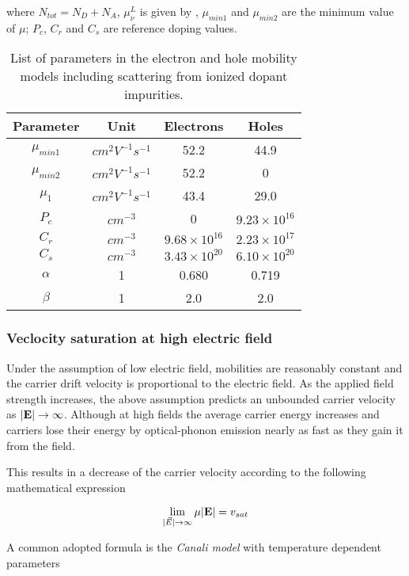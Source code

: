 where $N_{tot} = N_D + N_A$, $\mu_\nu^L$ is given by , $\mu_{min1}$ and $\mu_{min2}$  are the minimum value of $\mu$; $P_c$, $C_r$ and $C_s$ are reference doping values.


\begin{table}[!h]
\centering
\begin{tabular}{cccc}
\toprule
Parameter & Unit & Electrons & Holes \\
\midrule
$\mu_{min1}$ & $cm^2V^{-1}s^{-1}$ & 52.2 & 44.9\\
$\mu_{min2}$ & $cm^2V^{-1}s^{-1}$ & 52.2 & 0\\
$\mu_1$ & $cm^2V^{-1}s^{-1}$ & 43.4 & 29.0 \\
$P_c$ & $cm^{-3}$ & 0 & $9.23\times 10^{16}$\\
$C_r$ & $cm^{-3}$ &  $9.68\times 10^{16}$ & $2.23\times 10^{17}$ \\
$C_s$ & $cm^{-3}$ & $3.43\times 10^{20}$ & $6.10\times 10^{20}$\\
$\alpha$& 1 & 0.680 & 0.719  \\
$\beta$& 1 & 2.0 & 2.0 \\
\bottomrule
\end{tabular}
\caption{List of parameters in the electron and hole mobility models including scattering from ionized dopant impurities.}
\end{table}


\subsubsection{Veclocity saturation at high electric field}

Under the assumption of low electric field, mobilities are reasonably constant and the carrier drift velocity is proportional to the electric field. As the applied field strength increases, the above assumption predicts an unbounded carrier velocity as $|\mathbf{E}| \rightarrow \infty$. Although at high fields the average carrier energy increases and carriers lose their energy by optical-phonon emission nearly as fast as they gain it from the field.

This results in a decrease of the carrier velocity according to the following mathematical expression

\begin{equation}
\label{eq: velocity saturation}
\lim_{|\vec{E}| \to \infty} \mu |\mathbf{E}| = v_{sat}
\end{equation} 

A common adopted formula is the \textit{Canali model} \cite{Canali:Vsat} with temperature dependent parameters

